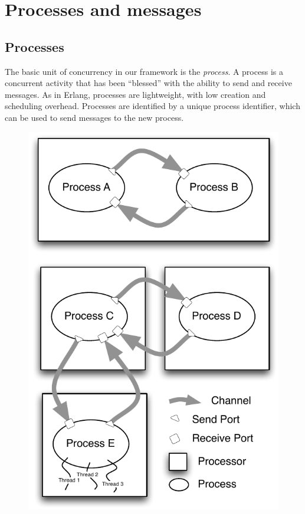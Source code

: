 \documentclass[preprint]{sigplanconf}
\begin{document}
\section{Processes and messages}
\label{Processes}
\subsection{Processes}
The basic unit of concurrency in our framework is the {\em process}. A process is a concurrent activity that has been ``blessed'' with the ability to send and receive messages. As in Erlang, processes are lightweight, with low creation and scheduling overhead.  Processes are identified by a unique process identifier, which can be used to send messages to the new process.

\begin{figure}
\centerline {
\includegraphics[width=\columnwidth]{threadsAndProcesses}
}
\end{figure}
\end{document}
